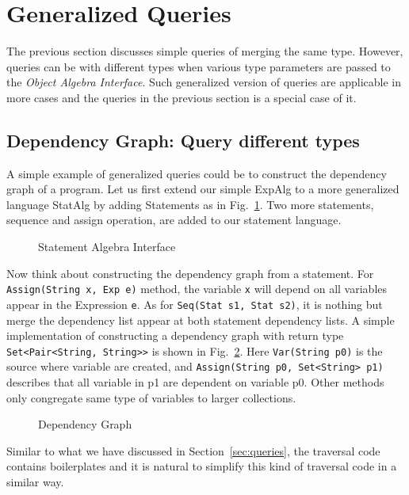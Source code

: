 \section{Generalized Queries}\label{sec:generalizedQueries}
The previous section discusses simple queries of merging the same type. However, queries can be with different types when various type parameters are passed to the \textit{Object Algebra Interface}. Such generalized version of queries are applicable in more cases and the queries in the previous section is a special case of it. 

\subsection{Dependency Graph: Query different types}\label{subsec:depGraph}
A simple example of generalized queries could be to construct the dependency graph of a program. Let us first extend our simple ExpAlg to a more generalized language StatAlg by adding Statements as in Fig.~\ref{statalg}. Two more statements, sequence and assign operation, are added to our statement language. 

\begin{figure}[tb]
\vspace{-.1in}
\caption{Statement Algebra Interface}
\label{statalg}
\end{figure}

Now think about constructing the dependency graph from a statement. For \lstinline{Assign(String x, Exp e)} method, the variable \lstinline{x} will depend on all variables appear in the Expression \lstinline{e}. As for \lstinline{Seq(Stat s1, Stat s2)}, it is nothing but merge the dependency list appear at both statement dependency lists. A simple implementation of constructing a dependency graph with return type \lstinline{Set<Pair<String, String>>} is shown in Fig.~\ref{deps1}. Here \lstinline{Var(String p0)} is the source where variable are created, and \lstinline{Assign(String p0, Set<String> p1)} describes that all variable in p1 are dependent on variable p0. Other methods only congregate same type of variables to larger collections. 

\begin{figure}[tb]
\vspace{-.1in}
\caption{Dependency Graph}
\label{deps1}
\end{figure}

Similar to what we have discussed in Section~\ref{sec:queries}, the traversal code contains boilerplates and it is natural to simplify this kind of traversal code in a similar way. 

